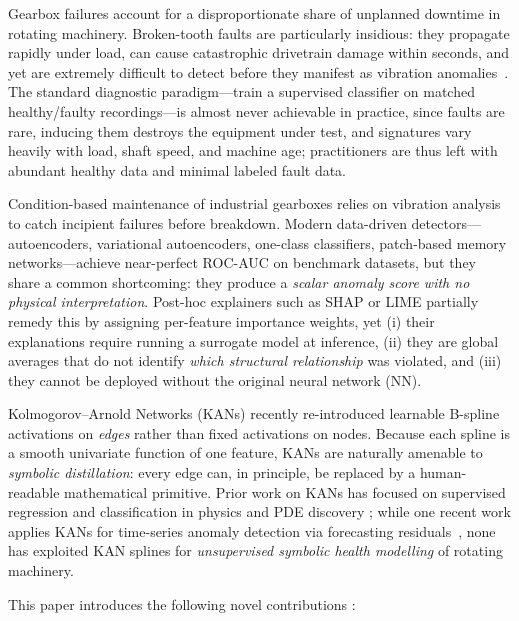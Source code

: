 \documentclass[conference]{IEEEtran}
\begin{document}
Gearbox failures account for a disproportionate share of unplanned
downtime in rotating machinery. Broken-tooth faults are particularly
insidious: they propagate rapidly under load, can cause catastrophic
drivetrain damage within seconds, and yet are extremely difficult to
detect before they manifest as vibration anomalies~\cite{lei2020}.
The standard diagnostic paradigm---train a supervised classifier on
matched healthy/faulty recordings---is almost never achievable in
practice, since faults are rare, inducing them destroys the equipment
under test, and signatures vary heavily with load, shaft speed, and
machine age; practitioners are thus left with abundant healthy data
and minimal labeled fault data.

Condition-based maintenance of industrial gearboxes relies on
vibration analysis to catch incipient failures before
breakdown. Modern data-driven detectors---autoencoders,
variational autoencoders, one-class classifiers, patch-based
memory networks---achieve near-perfect ROC-AUC on benchmark
datasets, but they share a common shortcoming: they produce a
\emph{scalar anomaly score with no physical interpretation}.
Post-hoc explainers such as SHAP or LIME partially remedy this by
assigning per-feature importance weights, yet (i) their explanations
require running a surrogate model at inference, (ii) they are global
averages that do not identify \emph{which structural relationship}
was violated, and (iii) they cannot be deployed without the original
neural network (NN).

Kolmogorov--Arnold Networks (KANs) \cite{liu2024kan} recently
re-introduced learnable B-spline activations on \emph{edges} rather
than fixed activations on nodes. Because each spline is a smooth
univariate function of one feature, KANs are naturally amenable to
\emph{symbolic distillation}: every edge can, in principle, be
replaced by a human-readable mathematical primitive. Prior work
on KANs has focused on supervised regression and classification
in physics and PDE discovery \cite{liu2024kan,vaca2024kolmogorov};
while one recent work applies KANs for time-series anomaly detection
via forecasting residuals~\cite{kanad2025}, none has exploited KAN
splines for \emph{unsupervised symbolic health modelling} of rotating machinery.

This paper introduces the following
novel contributions :
\end{document}
